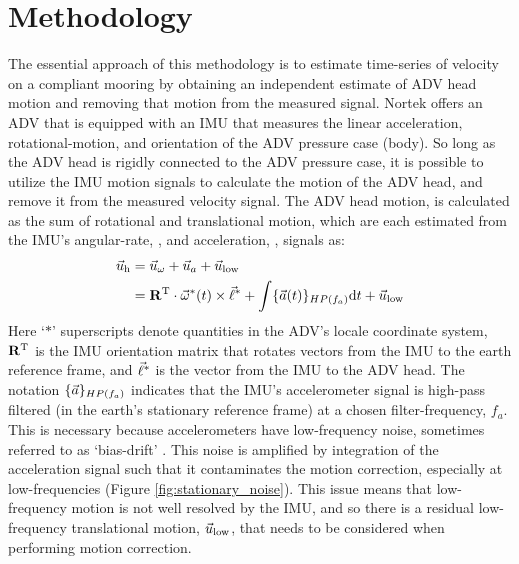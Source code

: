 
\section{Methodology}
\label{sec:methods}


The essential approach of this methodology is to estimate time-series of velocity on a compliant mooring by obtaining an independent estimate of ADV head motion and removing that motion from the measured signal. Nortek offers an ADV that is equipped with an IMU that measures the linear acceleration, rotational-motion, and orientation of the ADV pressure case (body). So long as the ADV head is rigidly connected to the ADV pressure case, it is possible to utilize the IMU motion signals to calculate the motion of the ADV head, and remove it from the measured velocity signal.  The ADV head motion, is calculated as the sum of rotational and translational motion, which are each estimated from the IMU's angular-rate, \AngRt, and acceleration, \Accel, signals as:
\begin{align}
  \vec{u}_\mathrm{h} & = \vec{u}_\omega + \vec{u}_a + \vec{u}_\mathrm{low} \\
      & = \mathbf{R}^\mathrm{T} \cdot \vec{\omega}^*(t)\times\vec{\ell}^* + \int \{{\vec{a}}(t)\}_{HP(f_{a})} \mathrm{d}t + \vec{u}_\mathrm{low}
        \label{eqn:uhead}
\end{align}
Here `$*$' superscripts denote quantities in the ADV's locale coordinate system, $\mathbf{R}^\mathrm{T}$ is the IMU orientation matrix that rotates vectors from the IMU to the earth reference frame, and $\vec{\ell}^*$ is the vector from the IMU to the ADV head. The notation $\{{\vec{a}}\}_{HP(f_a)}$ indicates that the IMU's accelerometer signal is high-pass filtered (in the earth's stationary reference frame) at a chosen filter-frequency, $f_a$. This is necessary because accelerometers have low-frequency noise, sometimes referred to as `bias-drift' . This noise is amplified by integration of the acceleration signal such that it contaminates the motion correction, especially at low-frequencies (Figure \ref{fig:stationary_noise}).  This issue means that low-frequency motion is not well resolved by the IMU, and so there is a residual low-frequency translational motion, $\vec{u}_\mathrm{low}$, that needs to be considered when performing motion correction.

